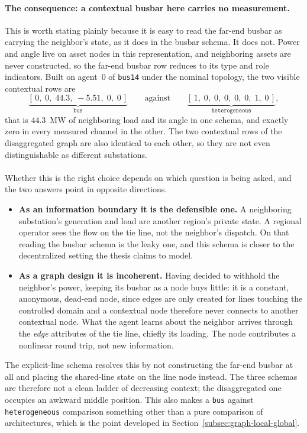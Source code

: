 {\color{clarif}
\paragraph{The consequence: a contextual busbar here carries no measurement.}
This is worth stating plainly because it is easy to read the far-end busbar as
carrying the neighbor's state, as it does in the busbar schema. It does not.
Power and angle live on asset nodes in this representation, and neighboring
assets are never constructed, so the far-end busbar row reduces to its type and
role indicators. Built on agent~$0$ of \texttt{bus14} under the nominal
topology, the two visible contextual rows are
\[
  \underbrace{[\,0,\;0,\;44.3,\;-5.51,\;0,\;0\,]}_{\texttt{bus}}
  \qquad\text{against}\qquad
  \underbrace{[\,1,\;0,\;0,\;0,\;0,\;0,\;1,\;0\,]}_{\texttt{heterogeneous}},
\]
that is $44.3$~MW of neighboring load and its angle in one schema, and exactly
zero in every measured channel in the other. The two contextual rows of the
disaggregated graph are also identical to each other, so they are not even
distinguishable as different substations.
\\
\\
Whether this is the right choice depends on which question is being asked, and
the two answers point in opposite directions.
\begin{itemize}
  \item \textbf{As an information boundary it is the defensible one.} A
  neighboring substation's generation and load are another region's private
  state. A regional operator sees the flow on the tie line, not the neighbor's
  dispatch. On that reading the busbar schema is the leaky one, and this schema
  is closer to the decentralized setting the thesis claims to model.
  \item \textbf{As a graph design it is incoherent.} Having decided to withhold
  the neighbor's power, keeping its busbar as a node buys little: it is a
  constant, anonymous, dead-end node, since edges are only created for lines
  touching the controlled domain and a contextual node therefore never connects
  to another contextual node. What the agent learns about the neighbor arrives
  through the \emph{edge} attributes of the tie line, chiefly its loading. The
  node contributes a nonlinear round trip, not new information.
\end{itemize}
The explicit-line schema resolves this by not constructing the far-end busbar at
all and placing the shared-line state on the line node instead. The three
schemas are therefore not a clean ladder of decreasing context; the
disaggregated one occupies an awkward middle position. This also makes a
\texttt{bus} against \texttt{heterogeneous} comparison something other than a
pure comparison of architectures, which is the point developed in
Section~\ref{subsec:graph-local-global}.
}


